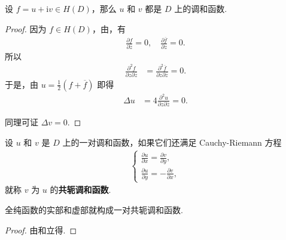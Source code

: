\documentclass[../../main.tex]{subfiles}
\begin{document}
\begin{theorem}\label{theorem:全纯函数的实部和虚部都是调和函数}
设 $f = u + \mathrm{i}v \in H(D)$，那么 $u$ 和 $v$ 都是 $D$ 上的调和函数.
\end{theorem}
\begin{proof}
因为 $f \in H(D)$，由，有
\begin{align*}
\frac{\partial f}{\partial \overline{z}} = 0, \quad
\frac{\partial \overline{f}}{\partial z} = 0.
\end{align*}
所以
\begin{align*}
\frac{\partial^2 f}{\partial z \partial \overline{z}} &= \frac{\partial^2 \overline{f}}{\partial z \partial \overline{z}} = 0.
\end{align*}
于是，由 $u = \frac{1}{2}(f + \overline{f})$ 即得
\begin{align*}
\Delta u &= 4 \frac{\partial^2 u}{\partial z \partial \overline{z}} = 0.
\end{align*}

同理可证 $\Delta v = 0$.
\end{proof}

\begin{definition}[共轭调和函数]
设 $u$ 和 $v$ 是 $D$ 上的一对调和函数，如果它们还满足 Cauchy-Riemann 方程
\begin{align}
\begin{cases} 
\displaystyle \frac{\partial u}{\partial x} = \frac{\partial v}{\partial y}, \\
\displaystyle \frac{\partial u}{\partial y} = -\frac{\partial v}{\partial x},
\end{cases} \label{eq:2.2.10}
\end{align}
就称 $v$ 为 $u$ 的\textbf{共轭调和函数}.
\end{definition}

\begin{proposition}
全纯函数的实部和虚部就构成一对共轭调和函数.
\end{proposition}
\begin{proof}
由和立得.
\end{proof}
\end{document}
